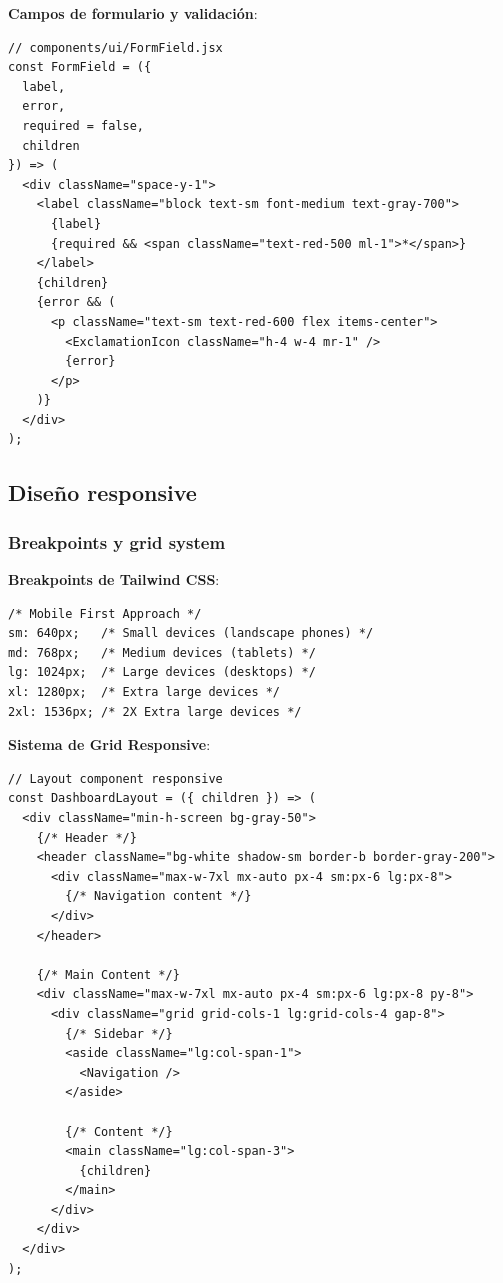 \documentclass[12pt,a4paper,oneside]{report}
\begin{document}
\textbf{Campos de formulario y validación}:

\begin{lstlisting}
// components/ui/FormField.jsx
const FormField = ({ 
  label, 
  error, 
  required = false, 
  children 
}) => (
  <div className="space-y-1">
    <label className="block text-sm font-medium text-gray-700">
      {label}
      {required && <span className="text-red-500 ml-1">*</span>}
    </label>
    {children}
    {error && (
      <p className="text-sm text-red-600 flex items-center">
        <ExclamationIcon className="h-4 w-4 mr-1" />
        {error}
      </p>
    )}
  </div>
);
\end{lstlisting}

\subsection{Diseño responsive}\label{diseuxf1o-responsive}

\subsubsection{Breakpoints y grid
system}\label{breakpoints-y-grid-system}

\textbf{Breakpoints de Tailwind CSS}:

\begin{lstlisting}
/* Mobile First Approach */
sm: 640px;   /* Small devices (landscape phones) */
md: 768px;   /* Medium devices (tablets) */
lg: 1024px;  /* Large devices (desktops) */
xl: 1280px;  /* Extra large devices */
2xl: 1536px; /* 2X Extra large devices */
\end{lstlisting}

\textbf{Sistema de Grid Responsive}:

\begin{lstlisting}
// Layout component responsive
const DashboardLayout = ({ children }) => (
  <div className="min-h-screen bg-gray-50">
    {/* Header */}
    <header className="bg-white shadow-sm border-b border-gray-200">
      <div className="max-w-7xl mx-auto px-4 sm:px-6 lg:px-8">
        {/* Navigation content */}
      </div>
    </header>
    
    {/* Main Content */}
    <div className="max-w-7xl mx-auto px-4 sm:px-6 lg:px-8 py-8">
      <div className="grid grid-cols-1 lg:grid-cols-4 gap-8">
        {/* Sidebar */}
        <aside className="lg:col-span-1">
          <Navigation />
        </aside>
        
        {/* Content */}
        <main className="lg:col-span-3">
          {children}
        </main>
      </div>
    </div>
  </div>
);
\end{lstlisting}
\end{document}
